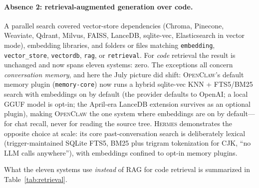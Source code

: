 \documentclass[11pt,a4paper]{article}
\newcommand{\ocl}{\textsc{OpenClaw}\xspace}
\newcommand{\hrm}{\textsc{Hermes}\xspace}
\begin{document}
\paragraph{Absence 2: retrieval-augmented generation over code.}
A parallel search covered vector-store dependencies (Chroma, Pinecone, Weaviate, Qdrant, Milvus, FAISS, LanceDB, sqlite-vec, Elasticsearch in vector mode), embedding libraries, and folders or files matching \texttt{embedding}, \texttt{vector\_store}, \texttt{vectordb}, \texttt{rag}, or \texttt{retrieval}.
For \emph{code} retrieval the result is unchanged and now spans eleven systems: zero.
The exceptions all concern \emph{conversation memory}, and here the July picture did shift: \ocl{}'s default memory plugin (\texttt{memory-core}) now runs a hybrid sqlite-vec KNN + FTS5/BM25 search with embeddings on by default (the provider defaults to OpenAI; a local GGUF model is opt-in; the April-era LanceDB extension survives as an optional plugin), making \ocl{} the one system where embeddings are on by default---for chat recall, never for reading the source tree.
\hrm{} demonstrates the opposite choice at scale: its core past-conversation search is deliberately lexical (trigger-maintained SQLite FTS5, BM25 plus trigram tokenization for CJK, ``no LLM calls anywhere''), with embeddings confined to opt-in memory plugins.

What the eleven systems use \emph{instead} of RAG for code retrieval is summarized in Table~\ref{tab:retrieval}.
\end{document}
